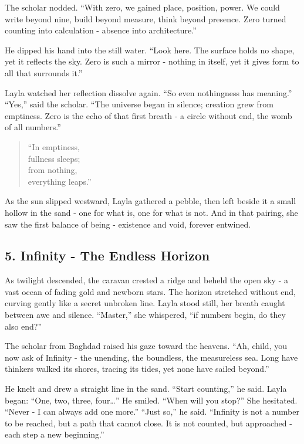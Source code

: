 \documentclass[
  letterpaper,
  DIV=11,
  numbers=noendperiod]{scrreprt}
\begin{document}
The scholar nodded. ``With zero, we gained place, position, power. We
could write beyond nine, build beyond measure, think beyond presence.
Zero turned counting into calculation - absence into architecture.''

He dipped his hand into the still water. ``Look here. The surface holds
no shape, yet it reflects the sky. Zero is such a mirror - nothing in
itself, yet it gives form to all that surrounds it.''

Layla watched her reflection dissolve again. ``So even nothingness has
meaning.'' ``Yes,'' said the scholar. ``The universe began in silence;
creation grew from emptiness. Zero is the echo of that first breath - a
circle without end, the womb of all numbers.''

\begin{quote}
``In emptiness,\\
fullness sleeps;\\
from nothing,\\
everything leaps.''
\end{quote}

As the sun slipped westward, Layla gathered a pebble, then left beside
it a small hollow in the sand - one for what is, one for what is not.
And in that pairing, she saw the first balance of being - existence and
void, forever entwined.

\subsection{5. Infinity - The Endless
Horizon}\label{infinity---the-endless-horizon}

As twilight descended, the caravan crested a ridge and beheld the open
sky - a vast ocean of fading gold and newborn stars. The horizon
stretched without end, curving gently like a secret unbroken line. Layla
stood still, her breath caught between awe and silence. ``Master,'' she
whispered, ``if numbers begin, do they also end?''

The scholar from Baghdad raised his gaze toward the heavens. ``Ah,
child, you now ask of Infinity - the unending, the boundless, the
measureless sea. Long have thinkers walked its shores, tracing its
tides, yet none have sailed beyond.''

He knelt and drew a straight line in the sand. ``Start counting,'' he
said. Layla began: ``One, two, three, four\ldots{}'' He smiled. ``When
will you stop?'' She hesitated. ``Never - I can always add one more.''
``Just so,'' he said. ``Infinity is not a number to be reached, but a
path that cannot close. It is not counted, but approached - each step a
new beginning.''
\end{document}
